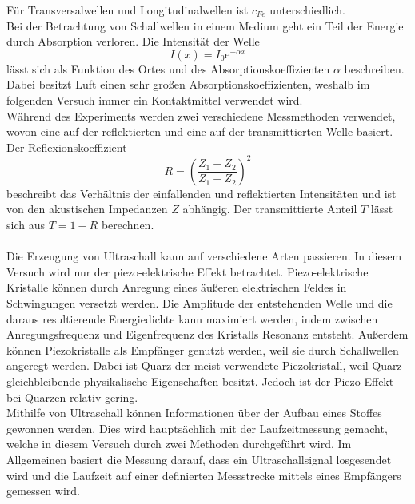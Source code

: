 Für Transversalwellen und Longitudinalwellen ist $c_{Fe}$ unterschiedlich.\\
Bei der Betrachtung von Schallwellen in einem Medium geht ein Teil der Energie durch Absorption verloren.
Die Intensität der Welle 
\begin{equation}
    I(x) = I_0 \text{e}^{-\alpha x}
    \label{eqn:Intensi}
\end{equation}
lässt sich als Funktion des Ortes und des Absorptionskoeffizienten $\alpha$ beschreiben. Dabei besitzt Luft einen sehr großen Absorptionskoeffizienten,
weshalb im folgenden Versuch immer ein Kontaktmittel verwendet wird.\\
Während des Experiments werden zwei verschiedene Messmethoden verwendet, wovon eine auf der reflektierten und eine auf der transmittierten Welle basiert.
Der Reflexionskoeffizient 
\begin{equation}
    R = (\frac{Z_1-Z_2}{Z_1+Z_2})^2
\end{equation}
beschreibt das Verhältnis der einfallenden und reflektierten Intensitäten und ist von den akustischen Impedanzen $Z$ abhängig.
Der transmittierte Anteil $T$ lässt sich aus $T = 1 - R$ berechnen.\\
\\
Die Erzeugung von Ultraschall kann auf verschiedene Arten passieren. In diesem Versuch wird nur der piezo-elektrische Effekt betrachtet.
Piezo-elektrische Kristalle können durch Anregung eines äußeren elektrischen Feldes in Schwingungen versetzt werden.
Die Amplitude der entstehenden Welle und die daraus resultierende Energiedichte kann maximiert werden, indem zwischen Anregungsfrequenz und Eigenfrequenz
des Kristalls Resonanz entsteht.
Außerdem können Piezokristalle als Empfänger genutzt werden, weil sie durch Schallwellen angeregt werden.
Dabei ist Quarz der meist verwendete Piezokristall, weil Quarz gleichbleibende physikalische Eigenschaften besitzt.
Jedoch ist der Piezo-Effekt bei Quarzen relativ gering.\\
Mithilfe von Ultraschall können Informationen über der Aufbau eines Stoffes gewonnen werden. Dies wird hauptsächlich mit der Laufzeitmessung gemacht,
welche in diesem Versuch durch zwei Methoden durchgeführt wird. Im Allgemeinen basiert die Messung darauf, dass ein Ultraschallsignal 
losgesendet wird und die Laufzeit auf einer definierten Messstrecke mittels eines Empfängers gemessen wird.\\
